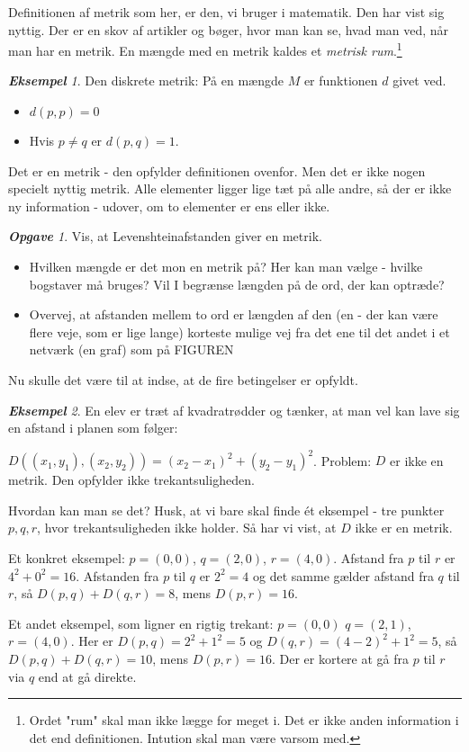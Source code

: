 \documentclass[a4paper, 12pt]{article}
\theoremstyle{remark}
\newtheorem{Eksempel}{\textbf{Eksempel}}
\newtheorem{Opgave}{\textbf{Opgave}}
\begin{document}
Definitionen af metrik som her, er den, vi bruger i matematik. Den har vist sig nyttig. Der er en skov af artikler og bøger, hvor man kan se, hvad man ved, når man har  en metrik. En mængde med en metrik kaldes et \emph{metrisk rum}.\footnote{Ordet "rum"  skal man ikke lægge for meget i. Det er ikke anden information i det end definitionen. Intution skal man være varsom med.}
\begin{Eksempel}
Den diskrete metrik: På en mængde $M$ er funktionen $d$ givet ved. 
\begin{itemize}
\item $d(p,p)=0$
\item Hvis $p\neq q$ er $d(p,q)=1$.
\end{itemize}
Det er en metrik - den opfylder definitionen ovenfor. Men det er ikke nogen specielt nyttig metrik. Alle elementer ligger lige tæt på alle andre, så der er ikke ny information - udover, om  to elementer er ens eller ikke.
\end{Eksempel}
\begin{Opgave}\label{Opg:Levensh} Vis, at Levenshteinafstanden giver en metrik. 
\begin{itemize}
\item Hvilken mængde er det mon en metrik på? Her kan man vælge - hvilke bogstaver må bruges? Vil I begrænse længden på de ord, der kan optræde? 
\item Overvej, at afstanden mellem to ord er længden af den (en - der kan være flere veje, som er lige lange)  korteste mulige vej fra det ene til det andet i et netværk (en graf) som på FIGUREN

\end{itemize}
Nu skulle det være til at indse, at de fire betingelser er opfyldt. 
\end{Opgave}
\begin{Eksempel}\label{ex:ikke-metrik} En elev er træt af kvadratrødder og tænker, at man vel kan lave sig en afstand i planen som følger:

 $D((x_1,y_1),(x_2,y_2))=(x_2-x_1)^2+(y_2-y_1)^2$. Problem: $D$ er ikke en metrik. Den opfylder ikke trekantsuligheden.

Hvordan kan man se det? Husk, at vi bare skal finde ét eksempel - tre punkter $p,q,r$, hvor trekantsuligheden ikke holder. Så har vi vist, at $D$ ikke er en metrik. 



Et konkret eksempel:  $p=(0,0)$, $q=(2,0)$, $r=(4,0)$. Afstand fra $p$ til $r$ er $4^2+0^2=16$. Afstanden fra $p$ til $q$ er $2^2=4$ og det samme gælder afstand fra $q$ til $r$, så $D(p,q)+D(q,r)=8$, mens $D(p,r)=16$.

Et andet eksempel, som ligner en rigtig trekant: $p=(0,0)$ $q=(2,1)$, $r=(4,0)$. Her er $D(p,q)=2^2+1^2=5$ og $D(q,r)=(4-2)^2+1^2=5$, så $D(p,q)+D(q,r)=10$, mens $D(p,r)=16$. Der er kortere at gå fra $p$ til $r$ via $q$ end at gå direkte. 


\end{Eksempel}
\end{document}
